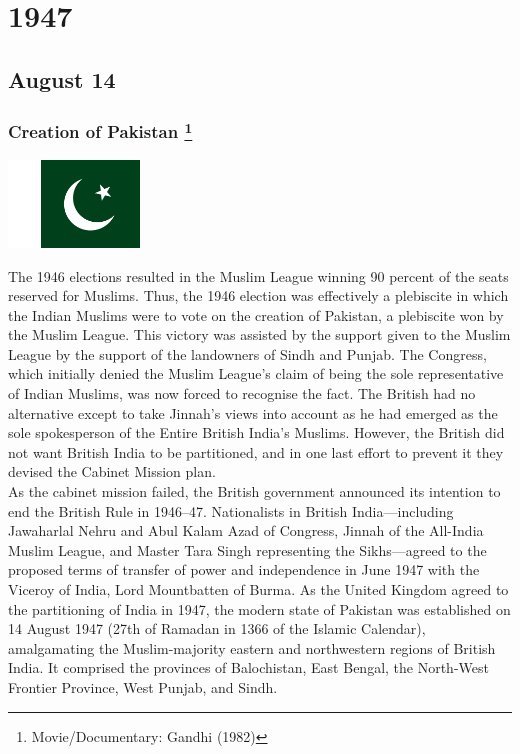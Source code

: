 \documentclass[11pt]{report}
\begin{document}
\chapter{1947}
\section{August 14}
\subsection{Creation of Pakistan \protect\footnote{Movie/Documentary: Gandhi (1982)}}
\vspace{2mm}\begin{center}\includegraphics[width=3.5cm]{./img/pakistanFlag.jpg}\end{center}
The 1946 elections resulted in the Muslim League winning 90 percent of the seats reserved for Muslims. Thus, the 1946 election was effectively a plebiscite in which the Indian Muslims were to vote on the creation of Pakistan, a plebiscite won by the Muslim League. This victory was assisted by the support given to the Muslim League by the support of the landowners of Sindh and Punjab. The Congress, which initially denied the Muslim League's claim of being the sole representative of Indian Muslims, was now forced to recognise the fact. The British had no alternative except to take Jinnah's views into account as he had emerged as the sole spokesperson of the Entire British India's Muslims. However, the British did not want British India to be partitioned, and in one last effort to prevent it they devised the Cabinet Mission plan.\\
\indent As the cabinet mission failed, the British government announced its intention to end the British Rule in 1946–47. Nationalists in British India—including Jawaharlal Nehru and Abul Kalam Azad of Congress, Jinnah of the All-India Muslim League, and Master Tara Singh representing the Sikhs—agreed to the proposed terms of transfer of power and independence in June 1947 with the Viceroy of India, Lord Mountbatten of Burma. As the United Kingdom agreed to the partitioning of India in 1947, the modern state of Pakistan was established on 14 August 1947 (27th of Ramadan in 1366 of the Islamic Calendar), amalgamating the Muslim-majority eastern and northwestern regions of British India. It comprised the provinces of Balochistan, East Bengal, the North-West Frontier Province, West Punjab, and Sindh.
\end{document}
